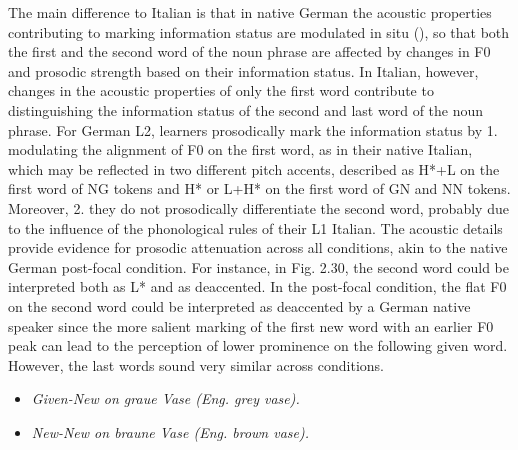The main difference to Italian is that in native German the acoustic properties contributing to marking information status are modulated in situ (\citealt{KüglerCalhoun2020}), so that both the first and the second word of the noun phrase are affected by changes in F0 and prosodic strength based on their information status. In Italian, however, changes in the acoustic properties of only the first word contribute to distinguishing the information status of the second and last word of the noun phrase. For German L2, learners prosodically mark the information status by 1. modulating the alignment of F0 on the first word, as in their native Italian, which may be reflected in two different pitch accents, described as H*+L on the first word of NG tokens and H* or L+H* on the first word of GN and NN tokens. Moreover, 2. they do not prosodically differentiate the second word, probably due to the influence of the phonological rules of their L1 Italian. The acoustic details provide evidence for prosodic attenuation across all conditions, akin to the native German post-focal condition. For instance, in Fig. 2.30, the second word could be interpreted both as L* and as deaccented. In the post-focal condition, the flat F0 on the second word could be interpreted as deaccented by a German native speaker since the more salient marking of the first new word with an earlier F0 peak can lead to the perception of lower prominence on the following given word. However, the last words sound very similar across conditions.

\begin{stylelsTable}
  
 
\end{stylelsTable}

\begin{itemize}
\item \begin{styleListParagraph}
\textit{Given-New on graue Vase (Eng. grey vase).}
\end{styleListParagraph}
\end{itemize}

  
  

\begin{itemize}
\item \begin{styleListParagraph}
\textit{New-New on braune Vase (Eng. brown vase).}
\end{styleListParagraph}
\end{itemize}


